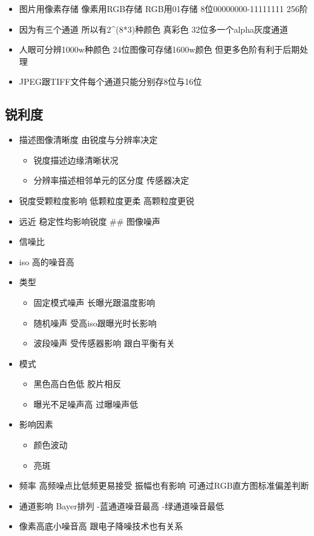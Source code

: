\documentclass[
  letterpaper,
  DIV=11,
  numbers=noendperiod]{scrreprt}
\providecommand{\tightlist}{%
  \setlength{\itemsep}{0pt}\setlength{\parskip}{0pt}}\usepackage{longtable,booktabs,array}
\begin{document}
\begin{itemize}
\tightlist
\item
  图片用像素存储 像素用RGB存储 RGB用01存储 8位00000000-11111111 256阶
\item
  因为有三个通道 所以有2\^{}(8*3)种颜色 真彩色 32位多一个alpha灰度通道
\item
  人眼可分辨1000w种颜色 24位图像可存储1600w颜色 但更多色阶有利于后期处理
\item
  JPEG跟TIFF文件每个通道只能分别存8位与16位
\end{itemize}

\subsection{锐利度}\label{ux9510ux5229ux5ea6}

\begin{itemize}
\tightlist
\item
  描述图像清晰度 由锐度与分辨率决定

  \begin{itemize}
  \tightlist
  \item
    锐度描述边缘清晰状况
  \item
    分辨率描述相邻单元的区分度 传感器决定
  \end{itemize}
\item
  锐度受颗粒度影响 低颗粒度更柔 高颗粒度更锐
\item
  远近 稳定性均影响锐度 \#\# 图像噪声
\item
  信噪比
\item
  iso 高的噪音高
\item
  类型

  \begin{itemize}
  \tightlist
  \item
    固定模式噪声 长曝光跟温度影响
  \item
    随机噪声 受高iso跟曝光时长影响
  \item
    波段噪声 受传感器影响 跟白平衡有关
  \end{itemize}
\item
  模式

  \begin{itemize}
  \tightlist
  \item
    黑色高白色低 胶片相反
  \item
    曝光不足噪声高 过曝噪声低
  \end{itemize}
\item
  影响因素

  \begin{itemize}
  \tightlist
  \item
    颜色波动
  \item
    亮斑
  \end{itemize}
\item
  频率 高频噪点比低频更易接受 振幅也有影响 可通过RGB直方图标准偏差判断
\item
  通道影响 Bayer排列 -蓝通道噪音最高 -绿通道噪音最低
\item
  像素高底小噪音高 跟电子降噪技术也有关系
\end{itemize}
\end{document}
